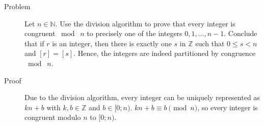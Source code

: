\begin{description}
\item[Problem] Let $n \in \mathbb N$. Use the division algorithm to prove that
every integer is congruent $\bmod\; n$ to precisely one of the integers $0, 1,
\dots, n - 1$. Conclude that if $r$ is an integer, then there is exactly one
$s$ in $\mathbb Z$ such that $0 \le s < n$ and $[r] = [s]$. Hence, the integers
are indeed partitioned by congruence $\bmod\; n$.

\item[Proof] Due to the division algorithm, every integer can be uniquely
represented as $kn + b$ with $k, b \in \mathbb Z$ and $b \in [0; n)$. $kn + b
\equiv b \pmod n$, so every integer is congruent modulo $n$ to $[0; n)$.

\end{description}
